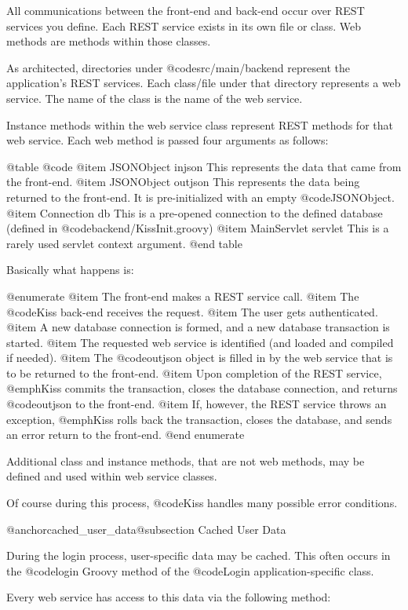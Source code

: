 All communications between the front-end and back-end occur over REST
services you define.  Each REST service exists in its own
file or class.  Web methods are methods within those classes.

As architected, directories under @code{src/main/backend}
represent the application's REST services.  Each class/file under that
directory represents a web service.  The name of the class is the name
of the web service.

Instance methods within the web service class represent REST methods
for that web service.  Each web method is passed four arguments as follows:

@table @code
@item JSONObject injson
This represents the data that came from the front-end.
@item JSONObject outjson
This represents the data being returned to the front-end.  It is pre-initialized with an empty @code{JSONObject}.
@item Connection db
This is a pre-opened connection to the defined database (defined in @code{backend/KissInit.groovy})
@item MainServlet servlet
This is a rarely used servlet context argument.
@end table

Basically what happens is:

@enumerate
@item
The front-end makes a REST service call.
@item
The @code{Kiss} back-end receives the request.
@item
The user gets authenticated.
@item
A new database connection is formed, and a new database transaction is started.
@item
The requested web service is identified (and loaded and compiled if needed).
@item
The @code{outjson} object is filled in by the web service that is to be returned to the front-end.
@item
Upon completion of the REST service, @emph{Kiss} commits the transaction, closes the database connection, and returns @code{outjson} to the front-end.
@item
If, however, the REST service throws an exception, @emph{Kiss} rolls back the transaction, closes the database, and sends an error return to the front-end.
@end enumerate

Additional class and instance methods, that are not web methods, may
be defined and used within web service classes.

Of course during this process, @code{Kiss} handles many possible error conditions.

@anchor{cached_user_data}@subsection Cached User Data

During the login process, user-specific data may be cached.  This
often occurs in the @code{login} Groovy method of the @code{Login}
application-specific class.

Every web service has access to this data via the following method:

